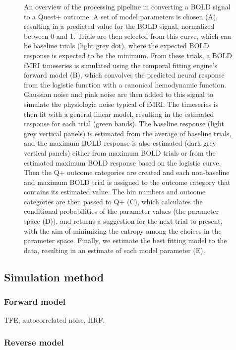 \documentclass[
  man,floatsintext]{apa6}
\begin{document}
\begin{figure}
\caption{An overview of the processing pipeline in converting a BOLD signal to a Quest+ outcome. A set of model parameters is chosen (A), resulting in a predicted value for the BOLD signal, normalized between 0 and 1. Trials are then selected from this curve, which can be baseline trials (light grey dot), where the expected BOLD response is expected to be the minimum. From these trials, a BOLD fMRI timeseries is simulated using the temporal fitting engine's forward model (B), which convolves the predicted neural response from the logistic function with a canonical hemodynamic function. Gaussian noise and pink noise are then added to this signal to simulate the physiologic noise typical of fMRI. The timeseries is then fit with a general linear model, resulting in the estimated response for each trial (green bands). The baseline response (light grey vertical panels) is estimated from the average of baseline trials, and the maximum BOLD response is also estimated (dark grey vertical panels) either from maximum BOLD trials or from the estimated maximum BOLD response based on the logistic curve. Then the Q+ outcome categories are created and each non-baseline and maximum BOLD trial is assigned to the outcome category that contains its estimated value. The bin numbers and outcome categories are then passed to Q+ (C), which calculates the conditional probabilities of the parameter values (the parameter space (D)), and returns a suggestion for the next trial to present, with the aim of minimizing the entropy among the choices in the parameter space. Finally, we estimate the best fitting model to the data, resulting in an estimate of each model parameter (E).
\newpage}\label{fig:methods-figure}
\end{figure}




\hypertarget{simulation-method}{%
\subsection{Simulation method}\label{simulation-method}}

\hypertarget{forward-model}{%
\subsubsection{Forward model}\label{forward-model}}

TFE, autocorrelated noise, HRF.

\hypertarget{reverse-model}{%
\subsubsection{Reverse model}\label{reverse-model}}
\end{document}
